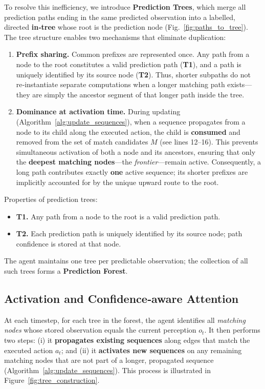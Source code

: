 \documentclass[11pt]{article}
\begin{document}
To resolve this inefficiency, we introduce \textbf{Prediction Trees}, which merge all prediction paths ending in the same predicted observation into a labelled, directed \textbf{in‑tree} whose root is the prediction node (Fig.~\ref{fig:paths_to_tree}). The tree structure enables two mechanisms that eliminate duplication:

\begin{enumerate}[itemsep=0.2em]
\item \textbf{Prefix sharing.} Common prefixes are represented once. Any path from a node to the root constitutes a valid prediction path (\textbf{T1}), and a path is uniquely identified by its source node (\textbf{T2}). Thus, shorter subpaths do not re‑instantiate separate computations when a longer matching path exists—they are simply the ancestor segment of that longer path inside the tree.
\item \textbf{Dominance at activation time.} During updating (Algorithm~\ref{alg:update_sequences}), when a sequence propagates from a node to its child along the executed action, the child is \textbf{consumed} and removed from the set of match candidates $M$ (see lines 12–16). This prevents simultaneous activation of both a node and its ancestors, ensuring that only the \textbf{deepest matching nodes}—the \emph{frontier}—remain active. Consequently, a long path contributes exactly \textbf{one} active sequence; its shorter prefixes are implicitly accounted for by the unique upward route to the root.
\end{enumerate}

Properties of prediction trees:
\begin{itemize}[itemsep=0.2em]
\item \textbf{T1.} Any path from a node to the root is a valid prediction path.
\item \textbf{T2.} Each prediction path is uniquely identified by its source node; path confidence is stored at that node.
\end{itemize}

The agent maintains one tree per predictable observation; the collection of all such trees forms a \textbf{Prediction Forest}.

\subsection{Activation and Confidence‑aware Attention}

At each timestep, for each tree in the forest, the agent identifies all \emph{matching nodes} whose stored observation equals the current perception $o_t$. It then performs two steps: (i) it \textbf{propagates existing sequences} along edges that match the executed action $a_t$; and (ii) it \textbf{activates new sequences} on any remaining matching nodes that are not part of a longer, propagated sequence (Algorithm~\ref{alg:update_sequences}). This process is illustrated in Figure~\ref{fig:tree_construction}.
\end{document}
